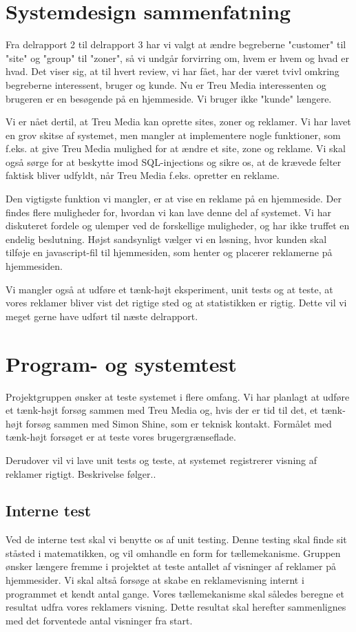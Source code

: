 \documentclass[a4paper,12pt]{article}
\begin{document}
\section{Systemdesign sammenfatning}
Fra delrapport 2 til delrapport 3 har vi valgt at ændre begreberne "customer" til "site" og "group" til "zoner", så vi undgår forvirring om, hvem er hvem og hvad er hvad. Det viser sig, at til hvert review, vi har fået, har der været tvivl omkring begreberne interessent, bruger og kunde. Nu er Treu Media interessenten og brugeren er en besøgende på en hjemmeside. Vi bruger ikke "kunde" længere.

Vi er nået dertil, at Treu Media kan oprette sites, zoner og reklamer. Vi har lavet en grov skitse af systemet, men mangler at implementere nogle funktioner, som f.eks. at give Treu Media mulighed for at ændre et site, zone og reklame. Vi skal også sørge for at beskytte imod SQL-injections og sikre os, at de krævede felter faktisk bliver udfyldt, når Treu Media f.eks. opretter en reklame. 

Den vigtigste funktion vi mangler, er at vise en reklame på en hjemmeside. Der findes flere muligheder for, hvordan vi kan lave denne del af systemet. Vi har diskuteret fordele og ulemper ved de forskellige muligheder, og har ikke truffet en endelig beslutning. Højst sandsynligt vælger vi en løsning, hvor kunden skal tilføje en javascript-fil til hjemmesiden, som henter og placerer reklamerne på hjemmesiden.

Vi mangler også at udføre et tænk-højt eksperiment, unit tests og at teste, at vores reklamer bliver vist det rigtige sted og at statistikken er rigtig. Dette vil vi meget gerne have udført til næste delrapport.

\section{Program- og systemtest}
Projektgruppen ønsker at teste systemet i flere omfang. Vi har planlagt at udføre et tænk-højt forsøg sammen med Treu Media og, hvis der er tid til det, et tænk-højt forsøg sammen med Simon Shine, som er teknisk kontakt. Formålet med tænk-højt forsøget er at teste vores brugergrænseflade.

Derudover vil vi lave unit tests og teste, at systemet registrerer visning af reklamer rigtigt. Beskrivelse følger..

\subsection{Interne test}
Ved de interne test skal vi benytte os af unit testing. Denne testing skal finde sit ståsted i matematikken, og vil omhandle en form for tællemekanisme. Gruppen ønsker længere fremme i projektet at teste antallet af visninger af reklamer på hjemmesider. Vi skal altså forsøge at skabe en reklamevisning internt i programmet et kendt antal gange. Vores tællemekanisme skal således beregne et resultat udfra vores reklamers visning. Dette resultat skal herefter sammenlignes med det forventede antal visninger fra start.
\end{document}
